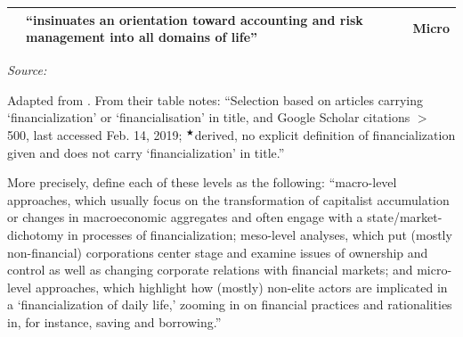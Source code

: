 \documentclass[a4paper, twoside]{templates/ociamthesis}
\begin{document}
\begin{table}[!ht]
{\begin{threeparttable}
\begin{tabular}[t]{l>{\raggedright\arraybackslash}p{}l}
\textcite[\text{p.} 43]{martin2002} & ``insinuates an orientation toward accounting and risk management into all domains of life'' & Micro\\
\bottomrule
\end{tabular}
\begin{tablenotes}[para]
\item \textit{\footnotesize{Source:}} 
\item \footnotesize{Adapted from \textcite[Table 1.1,  7]{mader2020}. From their table notes: ``Selection based on articles carrying `financialization' or `financialisation' in title, and Google Scholar citations $>$ 500, last accessed Feb. 14, 2019; ${}^\bigstar$derived, no explicit definition of financialization given and does not carry `financialization' in title.''}
\end{tablenotes}
\end{threeparttable}}
\end{table}

More precisely, \textcite[ 6]{mader2020} define each of these levels as the following: ``macro-level approaches, which usually focus on the transformation of capitalist accumulation or changes in macroeconomic aggregates and often engage with a state/market-dichotomy in processes of financialization; meso-level analyses, which put (mostly non-financial) corporations center stage and examine issues of ownership and control as well as changing corporate relations with financial markets; and micro-level approaches, which highlight how (mostly) non-elite actors are implicated in a `financialization of daily life,' zooming in on financial practices and rationalities in, for instance, saving and borrowing.''
\end{document}
